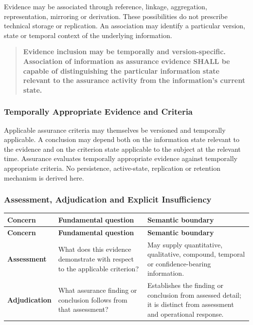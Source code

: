 \label{rad:enabling:734}

Evidence may be associated through reference, linkage, aggregation, representation, mirroring or derivation. These possibilities do not prescribe technical storage or replication. An association may identify a particular version, state or temporal context of the underlying information.

\label{rad:enabling:736}

\begin{quote}

\textbf{Evidence inclusion may be temporally and version-specific. Association of information as assurance evidence SHALL be capable of distinguishing the particular information state relevant to the assurance activity from the information's current state.}


\end{quote}
\label{rad:enabling:738}
\subsubsection*{Temporally Appropriate Evidence and Criteria}
\label{rad:enabling:740}

Applicable assurance criteria may themselves be versioned and temporally applicable. A conclusion may depend both on the information state relevant to the evidence and on the criterion state applicable to the subject at the relevant time. Assurance evaluates temporally appropriate evidence against temporally appropriate criteria. No persistence, active-state, replication or retention mechanism is derived here.

\label{rad:enabling:742}
\subsubsection*{Assessment, Adjudication and Explicit Insufficiency}
\label{rad:enabling:744}
\begingroup\small\setlength{\TableWidth}{\dimexpr\linewidth-6\tabcolsep-4\arrayrulewidth\relax}
\begin{longtable}{|>{\raggedright\arraybackslash}p{0.24\TableWidth}|>{\raggedright\arraybackslash}p{0.33\TableWidth}|>{\raggedright\arraybackslash}p{0.43\TableWidth}|}
\hline\rowcolor{TableHead}\textbf{Concern} & \textbf{Fundamental question} & \textbf{Semantic boundary}\\\hline\endfirsthead
\hline\rowcolor{TableHead}\textbf{Concern} & \textbf{Fundamental question} & \textbf{Semantic boundary}\\\hline\endhead
\hline\endfoot
\textbf{Assessment} & What does this evidence demonstrate with respect to the applicable criterion? & May supply quantitative, qualitative, compound, temporal or confidence-bearing information.\\\hline
\textbf{Adjudication} & What assurance finding or conclusion follows from that assessment? & Establishes the finding or conclusion from assessed detail; it is distinct from assessment and operational response.\\\hline
\end{longtable}\endgroup
{}\label{rad:enabling:749}

